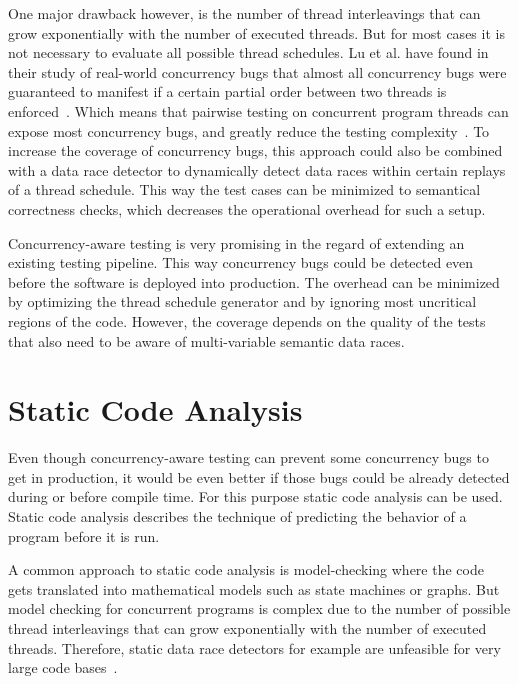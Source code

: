 \documentclass[conference]{IEEEtran}
\begin{document}
One major drawback however, is the number of thread interleavings that can grow exponentially with the number of executed threads.
But for most cases it is not necessary to evaluate all possible thread schedules.
Lu et al. have found in their study of real-world concurrency bugs that almost all concurrency bugs were guaranteed to manifest if a certain partial order between two threads is enforced~\cite{lu2008mistakes}.
Which means that pairwise testing on concurrent program threads can expose most concurrency bugs, and greatly reduce the testing complexity~\cite{lu2008mistakes}.
To increase the coverage of concurrency bugs, this approach could also be combined with a data race detector to dynamically detect data races within certain replays of a thread schedule.
This way the test cases can be minimized to semantical correctness checks, which decreases the operational overhead for such a setup.

Concurrency-aware testing is very promising in the regard of extending an existing testing pipeline.
This way concurrency bugs could be detected even before the software is deployed into production.
The overhead can be minimized by optimizing the thread schedule generator and by ignoring most uncritical regions of the code.
However, the coverage depends on the quality of the tests that also need to be aware of multi-variable semantic data races.


\section{Static Code Analysis}
\label{sct:static}

Even though concurrency-aware testing can prevent some concurrency bugs to get in production, it would be even better if those bugs could be already detected during or before compile time.
For this purpose static code analysis can be used.
Static code analysis describes the technique of predicting the behavior of a program before it is run.

A common approach to static code analysis is model-checking where the code gets translated into mathematical models such as state machines or graphs.
But model checking for concurrent programs is complex due to the number of possible thread interleavings that can grow exponentially with the number of executed threads.
Therefore, static data race detectors for example are unfeasible for very large code bases~\cite{serebry2009threadsanitizer}.
\end{document}
